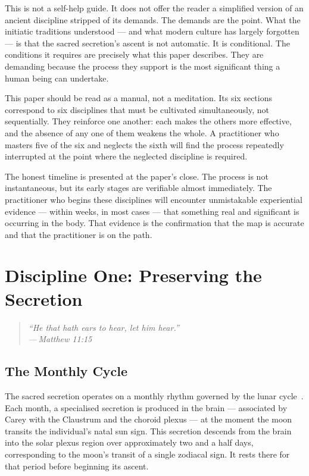\documentclass[12pt, a4paper]{article}
\newcommand{\epigraph}[2]{%
  \begin{quote}
    \itshape ``#1''\\[0.3em]
    \normalfont\small\hfill ---\,#2
  \end{quote}
}
\begin{document}
This is not a self-help guide. It does not offer the reader a simplified
version of an ancient discipline stripped of its demands. The demands are the
point. What the initiatic traditions understood — and what modern culture has
largely forgotten — is that the sacred secretion's ascent is not automatic. It
is conditional. The conditions it requires are precisely what this paper
describes. They are demanding because the process they support is the most
significant thing a human being can undertake.

This paper should be read as a manual, not a meditation. Its six sections
correspond to six disciplines that must be cultivated simultaneously, not
sequentially. They reinforce one another: each makes the others more
effective, and the absence of any one of them weakens the whole. A practitioner
who masters five of the six and neglects the sixth will find the process
repeatedly interrupted at the point where the neglected discipline is required.

The honest timeline is presented at the paper's close. The process is not
instantaneous, but its early stages are verifiable almost immediately. The
practitioner who begins these disciplines will encounter unmistakable
experiential evidence — within weeks, in most cases — that something real and
significant is occurring in the body. That evidence is the confirmation that
the map is accurate and that the practitioner is on the path.

\section{Discipline One: Preserving the Secretion}
\label{sec:preservation}

\epigraph{He that hath ears to hear, let him hear.}{Matthew 11:15}

\subsection{The Monthly Cycle}

The sacred secretion operates on a monthly rhythm governed by the lunar
cycle~\autocite{carey1932}. Each month, a specialised secretion is produced in
the brain — associated by Carey with the Claustrum and the choroid plexus —
at the moment the moon transits the individual's natal sun sign. This
secretion descends from the brain into the solar plexus region over
approximately two and a half days, corresponding to the moon's transit of a
single zodiacal sign. It rests there for that period before beginning its
ascent.
\end{document}
